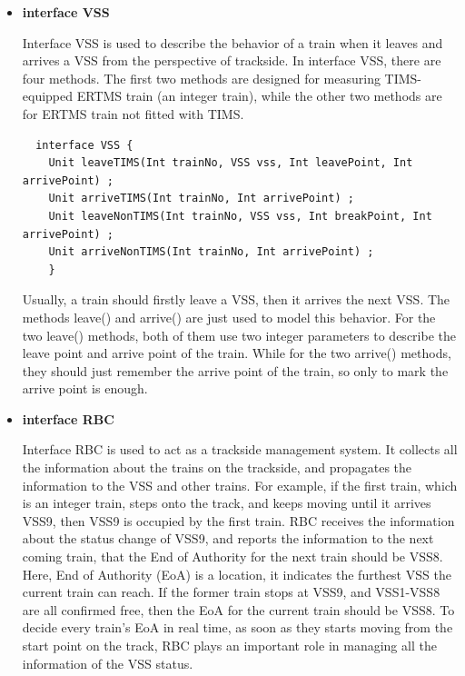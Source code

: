 \documentclass[article,dr=phil,type=msc,colorback,accentcolor=tud9c]{tudthesis}
\begin{document}
  \begin{itemize}	
  	
  	\item \textbf{interface VSS}
  	
  	Interface VSS is used to describe the behavior of a train when it leaves and arrives a VSS from the perspective of trackside. In interface VSS, there are four methods. The first two methods are designed for measuring TIMS-equipped ERTMS train (an integer train), while the other two methods are for ERTMS train not fitted with TIMS. 
  	
  	\begin{lstlisting}
  interface VSS {
  	Unit leaveTIMS(Int trainNo, VSS vss, Int leavePoint, Int arrivePoint) ;
  	Unit arriveTIMS(Int trainNo, Int arrivePoint) ;  		
  	Unit leaveNonTIMS(Int trainNo, VSS vss, Int breakPoint, Int arrivePoint) ;
  	Unit arriveNonTIMS(Int trainNo, Int arrivePoint) ;
  	}\end{lstlisting}
  	  	  	
  	Usually, a train should firstly leave a VSS, then it arrives the next VSS. The methods leave() and arrive() are just used to model this behavior. For the two leave() methods, both of them use two integer parameters to describe the leave point and arrive point of the train. While for the two arrive() methods, they should just remember the arrive point of the train, so only to mark the arrive point is enough. 
  	
  	\item \textbf{interface RBC}
  	
  	Interface RBC is used to act as a trackside management system. It collects all the information about the trains on the trackside, and propagates the information to the VSS and other trains. For example, if the first train, which is an integer train, steps onto the track, and keeps moving until it arrives VSS9, then VSS9 is occupied by the first train. RBC receives the information about the status change of VSS9, and reports the information to the next coming train, that the End of Authority for the next train should be VSS8. Here, End of Authority (EoA) is a location, it indicates the furthest VSS the current train can reach. If the former train stops at VSS9, and VSS1-VSS8 are all confirmed free, then the EoA for the current train should be VSS8. To decide every train's EoA in real time, as soon as they starts moving from the start point on the track, RBC plays an important role in managing all the information of the VSS status.
  	

\end{itemize}
\end{document}
